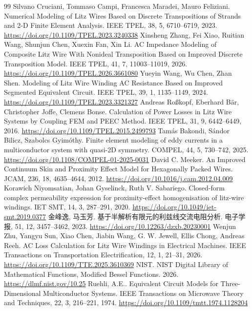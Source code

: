 \begin{thebibliography}{99}
 Silvano Cruciani, Tommaso Campi, Francesca Maradei, Mauro Feliziani. Numerical Modeling of Litz Wires Based on Discrete Transpositions of Strands and 2-D Finite Element Analysis. IEEE TPEL, 38, 5, 6710--6719, 2023. \url{https://doi.org/10.1109/TPEL.2023.3240338}
 Xinsheng Zhang, Fei Xiao, Ruitian Wang, Shunjun Chen, Xuexin Fan, Xin Li. AC Impedance Modeling of Composite Litz Wire With Nonideal Transposition Based on Improved Discrete Transposition Model. IEEE TPEL, 41, 7, 11003--11019, 2026. \url{https://doi.org/10.1109/TPEL.2026.3661080}
 Yueyin Wang, Wu Chen, Zhan Shen. Modeling of Litz Wire Winding AC Resistance Based on Improved Segmented Equivalent Circuit. IEEE TPEL, 39, 1, 1135--1149, 2024. \url{https://doi.org/10.1109/TPEL.2023.3321327}
 Andreas Roßkopf, Eberhard Bär, Christopher Joffe, Clemens Bonse. Calculation of Power Losses in Litz Wire Systems by Coupling FEM and PEEC Method. IEEE TPEL, 31, 9, 6442--6449, 2016. \url{https://doi.org/10.1109/TPEL.2015.2499793}
 Tamás Bakondi, Sándor Bilicz, Szabolcs Gyimóthy. Finite element modeling of eddy currents in a multiconductor system with quasi-2D symmetry. COMPEL, 44, 5, 730--742, 2025. \url{https://doi.org/10.1108/COMPEL-01-2025-0031}
 David C. Meeker. An Improved Continuum Skin and Proximity Effect Model for Hexagonally Packed Wires. JCAM, 236, 18, 4635--4644, 2012. \url{https://doi.org/10.1016/j.cam.2012.04.009}
 Korawich Niyomsatian, Johan Gyselinck, Ruth V. Sabariego. Closed-form complex permeability expression for proximity-effect homogenisation of litz-wire windings. IET SMT, 14, 3, 287--291, 2020. \url{https://doi.org/10.1049/iet-smt.2019.0377}
 金峰逸, 马玉芳. 基于半解析有限元的利兹线交流电阻分析. 电子学报, 51, 12, 3457--3462, 2023. \url{https://doi.org/10.12263/dzxb.20230001}
 Wenjun Zhu, Yangyu Sun, Xiao Chen, Jiabin Wang, G. W. Jewell, Ellis Chong, Andreas Reeh. AC Loss Calculation for Litz Wire Windings in Electrical Machines. IEEE Transactions on Transportation Electrification, 12, 1, 21--31, 2026. \url{https://doi.org/10.1109/TTE.2025.3610369}
 NIST. NIST Digital Library of Mathematical Functions, Modified Bessel Functions. 2026. \url{https://dlmf.nist.gov/10.25}
 Ruehli, A.E.. Equivalent Circuit Models for Three-Dimensional Multiconductor Systems. IEEE Transactions on Microwave Theory and Techniques, 22, 3, 216--221, 1974. \url{https://doi.org/10.1109/tmtt.1974.1128204}

\end{thebibliography}
